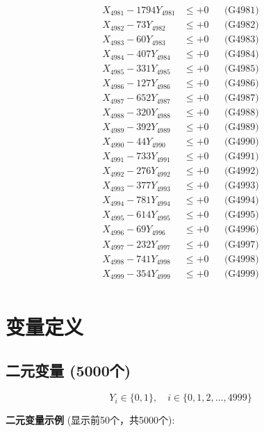 \documentclass[a4paper,10pt]{article}
\begin{document}
{\begin{align}
\allowbreak
X_{4981} - 1794Y_{4981} &\leq +0 && \text{(G4981)} \\
X_{4982} - 73Y_{4982} &\leq +0 && \text{(G4982)} \\
X_{4983} - 60Y_{4983} &\leq +0 && \text{(G4983)} \\
X_{4984} - 407Y_{4984} &\leq +0 && \text{(G4984)} \\
X_{4985} - 331Y_{4985} &\leq +0 && \text{(G4985)} \\
X_{4986} - 127Y_{4986} &\leq +0 && \text{(G4986)} \\
X_{4987} - 652Y_{4987} &\leq +0 && \text{(G4987)} \\
X_{4988} - 320Y_{4988} &\leq +0 && \text{(G4988)} \\
X_{4989} - 392Y_{4989} &\leq +0 && \text{(G4989)} \\
X_{4990} - 44Y_{4990} &\leq +0 && \text{(G4990)} \\
\allowbreak
X_{4991} - 733Y_{4991} &\leq +0 && \text{(G4991)} \\
X_{4992} - 276Y_{4992} &\leq +0 && \text{(G4992)} \\
X_{4993} - 377Y_{4993} &\leq +0 && \text{(G4993)} \\
X_{4994} - 781Y_{4994} &\leq +0 && \text{(G4994)} \\
X_{4995} - 614Y_{4995} &\leq +0 && \text{(G4995)} \\
X_{4996} - 69Y_{4996} &\leq +0 && \text{(G4996)} \\
X_{4997} - 232Y_{4997} &\leq +0 && \text{(G4997)} \\
X_{4998} - 741Y_{4998} &\leq +0 && \text{(G4998)} \\
X_{4999} - 354Y_{4999} &\leq +0 && \text{(G4999)} \\
\end{align}
}

\section{变量定义}

\subsection{二元变量 (5000个)}

\begin{equation}
Y_i \in \{0,1\}, \quad i \in \{0, 1, 2, \ldots, 4999\}
\end{equation}

\textbf{二元变量示例} (显示前50个，共5000个):
\end{document}
